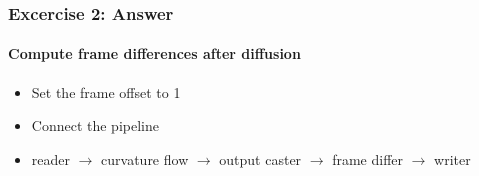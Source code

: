 {
\begin{frame}[fragile]
\frametitle{Excercise 2: Answer}
\framesubtitle{Compute frame differences after diffusion}
\begin{itemize}
\item Set the frame offset to 1
\pause

\item Connect the pipeline
\item reader $\rightarrow$ curvature flow $\rightarrow$ output caster
  $\rightarrow$ frame differ $\rightarrow$ writer
\end{itemize}
\end{frame}
}
